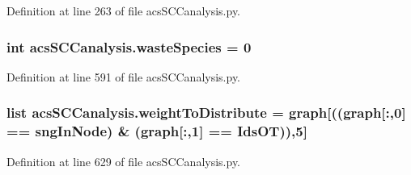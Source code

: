 Definition at line 263 of file acs\-S\-C\-Canalysis.\-py.

\hypertarget{a00128_ace0de61f3c6aa14b4197156be3a68280}{
\subsubsection[{waste\-Species}]{\setlength{\rightskip}{0pt plus 5cm}int acs\-S\-C\-Canalysis.\-waste\-Species = 0}}\label{a00128_ace0de61f3c6aa14b4197156be3a68280}


Definition at line 591 of file acs\-S\-C\-Canalysis.\-py.

\hypertarget{a00128_a5162bfbe5eb2618736d1f77bb3125a9b}{
\subsubsection[{weight\-To\-Distribute}]{\setlength{\rightskip}{0pt plus 5cm}list acs\-S\-C\-Canalysis.\-weight\-To\-Distribute = {\bf graph}\mbox{[}(({\bf graph}\mbox{[}\-:,0\mbox{]} == sng\-In\-Node) \& ({\bf graph}\mbox{[}\-:,1\mbox{]} == Ids\-O\-T)),5\mbox{]}}}\label{a00128_a5162bfbe5eb2618736d1f77bb3125a9b}


Definition at line 629 of file acs\-S\-C\-Canalysis.\-py.

